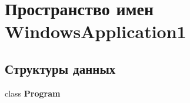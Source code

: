 \hypertarget{namespace_windows_application1}{
\section{Пространство имен WindowsApplication1}
\label{namespace_windows_application1}
}
\subsection*{Структуры данных}
\begin{CompactItemize}
\item 
class \textbf{Program}
\end{CompactItemize}
